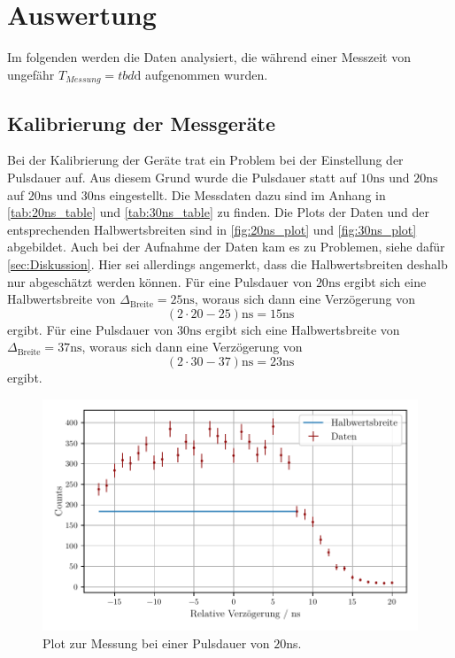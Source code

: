 \section{Auswertung}
\label{sec:Auswertung}

Im folgenden werden die Daten analysiert, die während einer Messzeit von ungefähr $T_{Messung} = tbd  \unit\day$ aufgenommen wurden.

\subsection{Kalibrierung der Messgeräte}

Bei der Kalibrierung der Geräte trat ein Problem bei der Einstellung der Pulsdauer auf.
Aus diesem Grund wurde die Pulsdauer statt auf $10 \unit{\nano\second}$ und $20 \unit{\nano\second}$ auf $20 \unit{\nano\second}$ und $30 \unit{\nano\second}$ eingestellt.
Die Messdaten dazu sind im Anhang in \autoref{tab:20ns_table} und \autoref{tab:30ns_table} zu finden.
Die Plots der Daten und der entsprechenden Halbwertsbreiten sind in \autoref{fig:20ns_plot} und \autoref{fig:30ns_plot} abgebildet.
Auch bei der Aufnahme der Daten kam es zu Problemen, siehe dafür \autoref{sec:Diskussion}.
Hier sei allerdings angemerkt, dass die Halbwertsbreiten deshalb nur abgeschätzt werden können.
Für eine Pulsdauer von $20 \unit{\nano\second}$ ergibt sich eine Halbwertsbreite von $\Delta_\text{Breite} = 25 \unit{\nano\second}$, woraus sich dann eine Verzögerung von
\begin{equation*}
    (2 \cdot 20 - 25) \unit{\nano\second} = 15 \unit{\nano\second}  
\end{equation*}
ergibt.
Für eine Pulsdauer von $30 \unit{\nano\second}$ ergibt sich eine Halbwertsbreite von $\Delta_\text{Breite} = 37 \unit{\nano\second}$, woraus sich dann eine Verzögerung von
\begin{equation*}
    (2 \cdot 30 - 37) \unit{\nano\second} = 23 \unit{\nano\second}  
\end{equation*}
ergibt.

\begin{figure}
    \centering
    \includegraphics[width = 0.7 \linewidth]{build/20ns_plot.pdf}
    \caption{Plot zur Messung bei einer Pulsdauer von $20$ns.}
    \label{fig:20ns_plot}
\end{figure}

